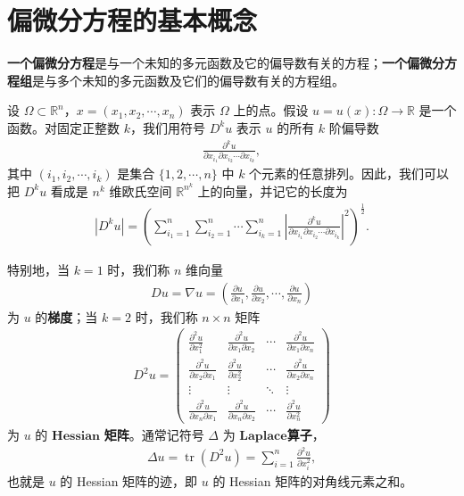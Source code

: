 \documentclass[../../main.tex]{subfiles}%
\begin{document}
\section{偏微分方程的基本概念}

\begin{definition}
\textbf{一个偏微分方程}是与一个未知的多元函数及它的偏导数有关的方程；\textbf{一个偏微分方程组}是与多个未知的多元函数及它们的偏导数有关的方程组。
\end{definition}

\begin{definition}
设 $\Omega\subset \mathbb{R}^n$，$x=(x_1,x_2,\cdots,x_n)$ 表示 $\Omega$ 上的点。假设 $u=u(x):\Omega\to\mathbb{R}$ 是一个函数。对固定正整数 $k$，我们用符号 $D^k u$ 表示 $u$ 的所有 $k$ 阶偏导数
\begin{align*}
\frac{\partial^k u}{\partial x_{i_1}\partial x_{i_2}\cdots\partial x_{i_k}},
\end{align*}
其中 $(i_1,i_2,\cdots,i_k)$ 是集合 $\{1,2,\cdots,n\}$ 中 $k$ 个元素的任意排列。因此，我们可以把 $D^k u$ 看成是 $n^k$ 维欧氏空间 $\mathbb{R}^{n^k}$ 上的向量，并记它的长度为
\begin{align*}
|D^k u| = \left( \sum_{i_1=1}^n \sum_{i_2=1}^n \cdots \sum_{i_k=1}^n \left| \frac{\partial^k u}{\partial x_{i_1}\partial x_{i_2}\cdots\partial x_{i_k}} \right|^2 \right)^{\frac{1}{2}}.
\end{align*}

特别地，当 $k=1$ 时，我们称 $n$ 维向量
\begin{align*}
Du  = \nabla u = \left( \frac{\partial u}{\partial x_1}, \frac{\partial u}{\partial x_2}, \cdots, \frac{\partial u}{\partial x_n} \right)
\end{align*}
为 $u$ 的\textbf{梯度}；当 $k=2$ 时，我们称 $n\times n$ 矩阵
\begin{align*}
D^2 u = \begin{pmatrix}
\frac{\partial^2 u}{\partial x_1^2} & \frac{\partial^2 u}{\partial x_1\partial x_2} & \cdots & \frac{\partial^2 u}{\partial x_1\partial x_n} \\
\frac{\partial^2 u}{\partial x_2\partial x_1} & \frac{\partial^2 u}{\partial x_2^2} & \cdots & \frac{\partial^2 u}{\partial x_2\partial x_n} \\
\vdots & \vdots & \ddots & \vdots \\
\frac{\partial^2 u}{\partial x_n\partial x_1} & \frac{\partial^2 u}{\partial x_n\partial x_2} & \cdots & \frac{\partial^2 u}{\partial x_n^2}
\end{pmatrix}
\end{align*}
为 $u$ 的 $\mathbf{Hessian}$ \textbf{矩阵}。通常记符号 $\Delta$ 为 $\mathbf{Laplace}$\textbf{算子}，
\begin{align*}
\Delta u = \operatorname{tr}(D^2 u) = \sum_{i=1}^n \frac{\partial^2 u}{\partial x_i^2},
\end{align*}
也就是 $u$ 的 Hessian 矩阵的迹，即 $u$ 的 Hessian 矩阵的对角线元素之和。
\end{definition}
\end{document}
